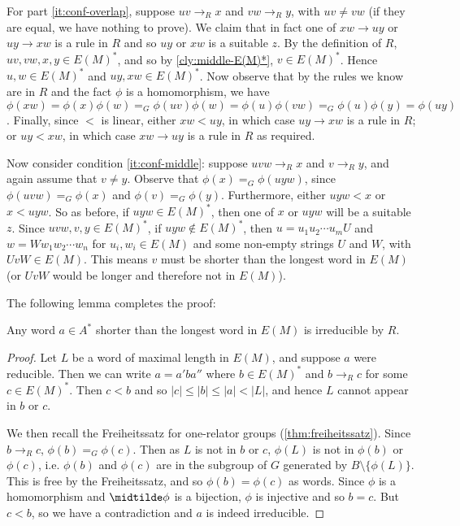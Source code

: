 \documentclass[showlabels,noindex,12pt]{lmaths}
\begin{document}
For part \ref{it:conf-overlap}, suppose $uv \to_R x$ and $vw \to_R y$, with $uv \ne vw$ (if they are equal, we have nothing to prove). We claim that in fact one of $xw \to uy$ or $uy \to xw$ is a rule in $R$ and so $uy$ or $xw$ is a suitable $z$. By the definition of $R$, $uv, vw, x, y\in E(M)^*$, and so by \cref{cly:middle-E(M)*}, $v \in E(M)^*$. Hence $u, w \in E(M)^*$ and $uy, xw \in E(M)^*$. Now observe that by the rules we know are in $R$ and the fact $\phi$ is a homomorphism, we have $\phi(xw) = \phi(x)\phi(w) =_G \phi(uv)\phi(w) = \phi(u)\phi(vw) =_G \phi(u)\phi(y) = \phi(uy)$. Finally, since $<$ is linear, either $xw < uy$, in which case $uy \to xw$ is a rule in $R$; or $uy < xw$, in which case $xw \to uy$ is a rule in $R$ as required.

Now consider condition \ref{it:conf-middle}: suppose $uvw \to_R x$ and $v \to_R y$, and again assume that $v \ne y$. Observe that $\phi(x) =_G \phi(uyw)$, since $\phi(uvw) =_G \phi(x)$ and $\phi(v) =_G \phi(y)$. Furthermore, either $uyw < x$ or $x < uyw$. So as before, if $uyw \in E(M)^*$, then one of $x$ or $uyw$ will be a suitable $z$. Since $uvw, v, y \in E(M)^*$, if $uyw \not\in E(M)^*$, then $u = u_1u_2 \cdots u_m U$ and $w = W w_1 w_2 \cdots w_n$ for $u_i, w_i \in E(M)$ and some non-empty strings $U$ and $W$, with $UvW \in E(M)$. This means $v$ must be shorter than the longest word in $E(M)$ (or $UvW$ would be longer and therefore not in $E(M)$).

The following lemma completes the proof:

\begin{lemma} \label{lma:shorter-irreducible}
	Any word $a \in A^*$ shorter than the longest word in $E(M)$ is irreducible by $R$.
\end{lemma}
\begin{proof}
	Let $L$ be a word of maximal length in $E(M)$, and suppose $a$ were reducible. Then we can write $a = a'ba''$ where $b \in E(M)^*$ and $b \to_R c$ for some $c \in E(M)^*$. Then $c < b$ and so $|c| \le |b| \le |a| < |L|$, and hence $L$ cannot appear in $b$ or $c$.
	
	We then recall the Freiheitssatz for one-relator groups (\cref{thm:freiheitssatz}).	Since $b \to_R c$, $\phi(b) =_G \phi(c)$. Then as $L$ is not in $b$ or $c$, $\phi(L)$ is not in $\phi(b)$ or $\phi(c)$, i.e. $\phi(b)$ and $\phi(c)$ are in the subgroup of $G$ generated by $B \setminus \{\phi(L)\}$. This is free by the Freiheitssatz, and so $\phi(b) = \phi(c)$ as words. Since $\phi$ is a homomorphism and $\midtilde\phi$ is a bijection, $\phi$ is injective and so $b = c$. But $c < b$, so we have a contradiction and $a$ is indeed irreducible.
\end{proof}
\end{document}
